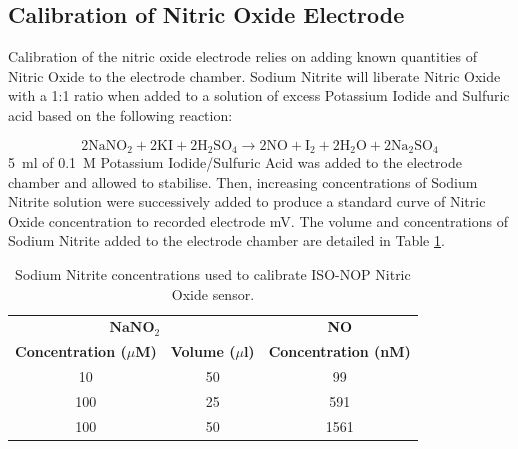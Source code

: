 \subsection{Calibration of Nitric Oxide Electrode}
Calibration of the nitric oxide electrode relies on adding known quantities of Nitric Oxide to the electrode chamber. Sodium Nitrite will liberate Nitric Oxide with a 1:1 ratio when added to a solution of excess Potassium Iodide and Sulfuric acid based on the following reaction:

\begin{equation}
2\mathrm{NaNO}_2 + 2\mathrm{KI} + 2 \mathrm{H}_2\mathrm{SO}_4 \longrightarrow 2\mathrm{NO} + \mathrm{I}_2 + 2\mathrm{H}_2\mathrm{O} + 2\mathrm{Na}_2\mathrm{SO}_4
\end{equation}
5~ml of 0.1~M Potassium Iodide/Sulfuric Acid was added to the electrode chamber and allowed to stabilise. Then, increasing concentrations of Sodium Nitrite solution were successively added to produce a standard curve of Nitric Oxide concentration to recorded electrode mV. The volume and concentrations of Sodium Nitrite added to the electrode chamber are detailed in Table \ref{tab:sodiumnitrite}.

\begin{table}[tbp]
\begin{center}
\begin{tabular}{ccc}
\toprule
\multicolumn{2}{c}{$\mathbf{NaNO}_2$} & \textbf{NO} \\
\textbf{Concentration ($\mu$M)} & \textbf{Volume ($\mu$l)} & \textbf{Concentration (nM)} \\
\midrule
10 & 50 & 99 \\
100 & 25 & 591 \\
100 & 50 & 1561 \\
\bottomrule
\end{tabular}
\end{center}
\caption{Sodium Nitrite concentrations used to calibrate ISO-NOP Nitric Oxide sensor.
\label{tab:sodiumnitrite}}
\end{table}

